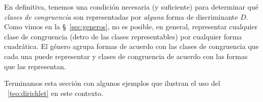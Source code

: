 En definitiva, tenemos una condici\'on necesaria (y suficiente)
para determinar qu\'e \emph{clases de congruencia} son representadas
por \emph{alguna} forma de discriminante $D$.
Como vimos en la \S~\ref{sec:generos}, no es posible, en general,
representar cualquier clase de congruencia (detro de las clases
representables) por cualquier forma cuadr\'atica.
El g\'enero agrupa formas de acuerdo con las clases de
congruencia que cada una puede representar y clases de congruencia
de acuerdo con las formas que las representan.

Terminamos esta secci\'on con algunos ejemplos que ilustran
el uso del \teoname~\ref{teo:dirichlet} en este contexto.

